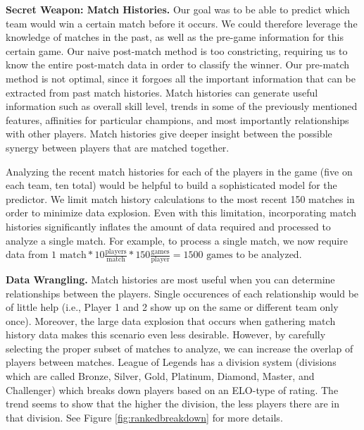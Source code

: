 \textbf{Secret Weapon: Match Histories. } Our goal was to be able to predict which team would win a certain match before it occurs. 
We could therefore leverage the knowledge of matches in the past, as well as the pre-game 
information for this certain game.  Our naive post-match method is too constricting, 
requiring us to know the entire post-match data in order to classify the winner.  Our pre-match 
method is not optimal, since it forgoes all the important information that can be extracted 
from past match histories.  Match histories can generate useful information such as 
overall skill level, trends in some of the previously mentioned features, 
affinities for particular champions, and most importantly relationships with other 
players.  Match histories give deeper insight between the possible synergy between 
players that are matched together.  

Analyzing the recent match histories for each of the players in the game 
(five on each team, ten total) would be helpful to build a sophisticated model for the predictor.  
We limit match history calculations to the most recent 150 matches in order to 
minimize data explosion.  Even with this 
limitation, incorporating match histories significantly inflates the amount of 
data required and processed to analyze a single match.  
For example, to process a single match, we now require data from $1 \mbox{ match} * 10 \frac{\mbox{players}}{\mbox{match}} * 150 \frac{\mbox{games}}{\mbox{player}} = 1500 \mbox{ games}$ to be analyzed. 


\textbf{Data Wrangling. } Match histories are most useful when you can determine relationships between the players. 
Single occurences of each relationship would be of little help (i.e., Player 1 and 2 show up on the same or different team only once).
Moreover, the large data explosion that occurs when gathering match history data makes this scenario even less desirable.  However, by carefully selecting the proper subset of matches to analyze, we can increase the overlap of players between matches. League of Legends has a division system (divisions which are called Bronze, Silver, Gold, Platinum, Diamond, Master, and Challenger) which breaks down players based on an ELO-type of rating. The trend seems to show that the higher the division, the less players there are in that division. See Figure \ref{fig:rankedbreakdown} for more details.

